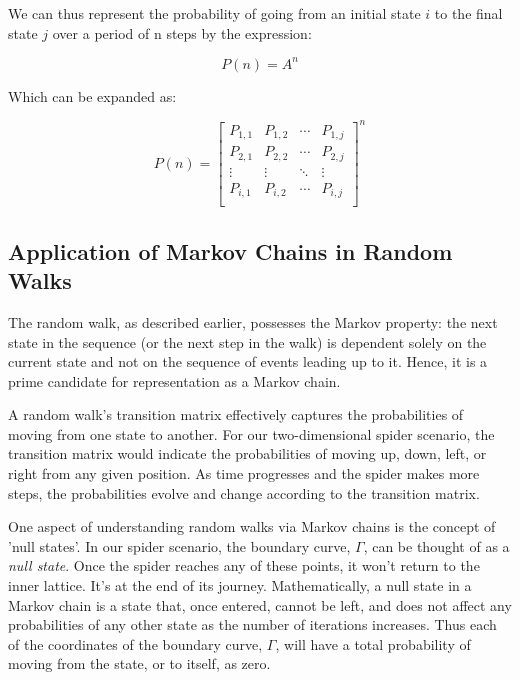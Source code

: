 \documentclass[12pt,a4paper]{article}
\begin{document}
We can thus represent the probability of going from an initial state $i$ to the final state $j$ over a period of n steps by the expression:

\begin{equation*}
    P(n) = A^n
\end{equation*}

Which can be expanded as:

\begin{equation*}
P(n) =  \begin{bmatrix}
    P_{1,1} & P_{1,2} & \cdots & P_{1,j} \\
    P_{2,1} & P_{2,2} & \cdots & P_{2,j} \\
    \vdots & \vdots & \ddots & \vdots \\
    P_{i,1} & P_{i,2} & \cdots & P_{i,j} \\
\end{bmatrix}^n
\end{equation*}

\subsection{Application of Markov Chains in Random Walks}
The random walk, as described earlier, possesses the Markov property: the next state in the sequence (or the next step in the walk) is dependent solely on the current state and not on the sequence of events leading up to it. Hence, it is a prime candidate for representation as a Markov chain.

A random walk's transition matrix effectively captures the probabilities of moving from one state to another. For our two-dimensional spider scenario, the transition matrix would indicate the probabilities of moving up, down, left, or right from any given position. As time progresses and the spider makes more steps, the probabilities evolve and change according to the transition matrix.

One aspect of understanding random walks via Markov chains is the concept of 'null states'. In our spider scenario, the boundary curve, \(\Gamma\), can be thought of as a \textit{null state}. Once the spider reaches any of these points, it won't return to the inner lattice. It's at the end of its journey. Mathematically, a null state in a Markov chain is a state that, once entered, cannot be left, and does not affect any probabilities of any other state as the number of iterations increases. Thus each of the coordinates of the boundary curve, $\Gamma$, will have a total probability of moving from the state, or to itself, as zero. 
\end{document}
